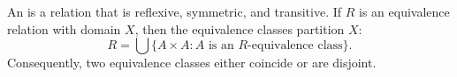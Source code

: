 An  is a relation that is reflexive, symmetric, and transitive.
If $R$ is an equivalence relation with domain $X$, then the equivalence classes partition $X$:
$$
R = \bigcup \{A \times A : A \text{ is an } R\text{-equivalence class}\}.
$$
Consequently, two equivalence classes either coincide or are disjoint.
